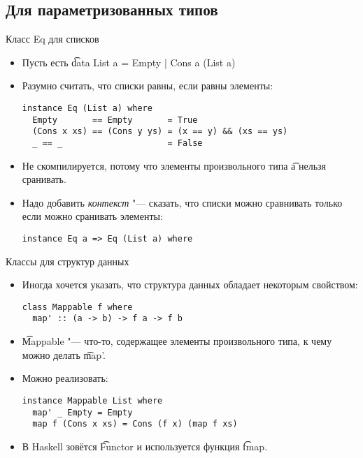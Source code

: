 \subsection{Для параметризованных типов}
\begin{frame}[fragile]{Класс Eq для списков}
	\begin{itemize}
		\item Пусть есть \t{data List a = Empty | Cons a (List a)}
		\item Разумно считать, что списки равны, если равны элементы:
\begin{verbatim}
instance Eq (List a) where
  Empty       == Empty       = True
  (Cons x xs) == (Cons y ys) = (x == y) && (xs == ys)
  _ == _                     = False
\end{verbatim}
		\item Не скомпилируется, потому что элементы произвольного типа \t{a} нельзя сранивать.
		\item Надо добавить \textit{контекст} "--- сказать, что списки можно сравнивать только если можно сранивать элементы:
\begin{verbatim}
instance Eq a => Eq (List a) where
\end{verbatim}
	\end{itemize}
\end{frame}

\begin{frame}[fragile]{Классы для структур данных}
	\begin{itemize}
		\item Иногда хочется указать, что структура данных обладает некоторым свойством:
\begin{verbatim}
class Mappable f where
  map' :: (a -> b) -> f a -> f b
\end{verbatim}
		\item \t{Mappable} "--- что-то, содержащее элементы произвольного типа, к чему можно делать \t{map'}.
		\item Можно реализовать:
\begin{verbatim}
instance Mappable List where
  map' _ Empty = Empty
  map f (Cons x xs) = Cons (f x) (map f xs)
\end{verbatim}
		\item В Haskell зовётся \t{Functor} и используется функция \t{fmap}.
	\end{itemize}
\end{frame}

